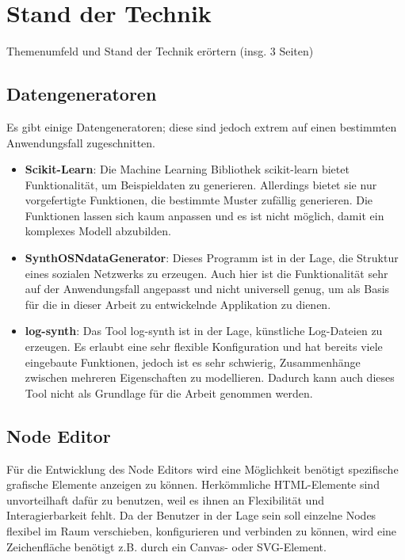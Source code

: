 
\chapter{Stand der Technik}

Themenumfeld und Stand der Technik erörtern (insg. 3 Seiten)

\section{Datengeneratoren}

Es gibt einige Datengeneratoren; diese sind jedoch extrem auf einen bestimmten Anwendungsfall zugeschnitten.

\begin{itemize}
    \item \textbf{Scikit-Learn}: Die Machine Learning Bibliothek scikit-learn bietet Funktionalität, um Beispieldaten zu generieren. Allerdings bietet sie nur vorgefertigte Funktionen, die bestimmte Muster zufällig generieren. Die Funktionen lassen sich kaum anpassen und es ist nicht möglich, damit ein komplexes Modell abzubilden. \cite{scikit-learn:paper, scikit-learn:generator}
    \item \textbf{SynthOSNdataGenerator}: Dieses Programm ist in der Lage, die Struktur eines sozialen Netzwerks zu erzeugen. Auch hier ist die Funktionalität sehr auf der Anwendungsfall angepasst und nicht universell genug, um als Basis für die in dieser Arbeit zu entwickelnde Applikation zu dienen. \cite{synthosndatagenerator}
    \item \textbf{log-synth}: Das Tool log-synth ist in der Lage, künstliche Log-Dateien zu erzeugen. Es erlaubt eine sehr flexible Konfiguration und hat bereits viele eingebaute Funktionen, jedoch ist es sehr schwierig, Zusammenhänge zwischen mehreren Eigenschaften zu modellieren. Dadurch kann auch dieses Tool nicht als Grundlage für die Arbeit genommen werden. \cite{logsynth}
\end{itemize}

\section{Node Editor}

Für die Entwicklung des Node Editors wird eine Möglichkeit benötigt spezifische grafische Elemente anzeigen zu können. Herkömmliche HTML-Elemente sind unvorteilhaft dafür zu benutzen, weil es ihnen an Flexibilität und Interagierbarkeit fehlt. Da der Benutzer in der Lage sein soll einzelne Nodes flexibel im Raum verschieben, konfigurieren und verbinden zu können, wird eine Zeichenfläche benötigt z.B. durch ein Canvas- oder SVG-Element.

